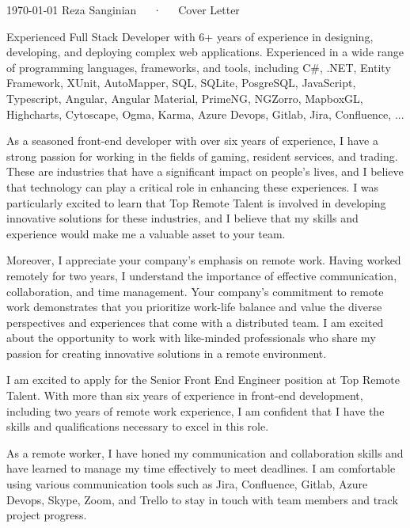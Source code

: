 \documentclass[11pt, a4paper]{awesome-cv}
\begin{document}
\makecvheader[R]

\makecvfooter
  {\today}
  {Reza Sanginian~~~·~~~Cover Letter}
  {}

\makelettertitle

\begin{cvletter}

Experienced Full Stack Developer with 6+ years of experience in designing, developing, and deploying complex web applications. Experienced in a
wide range of programming languages, frameworks, and tools, including C\#, .NET, Entity Framework, XUnit, AutoMapper, SQL, SQLite, PosgreSQL,
JavaScript, Typescript, Angular, Angular Material, PrimeNG, NGZorro, MapboxGL, Highcharts, Cytoscape, Ogma, Karma, Azure Devops, Gitlab, Jira,
Confluence, ...

As a seasoned front-end developer with over six years of experience, I have a strong passion for working in the fields of gaming, resident services, and trading. These are industries that have a significant impact on people's lives, and I believe that technology can play a critical role in enhancing these experiences. I was particularly excited to learn that Top Remote Talent is involved in developing innovative solutions for these industries, and I believe that my skills and experience would make me a valuable asset to your team.

Moreover, I appreciate your company's emphasis on remote work. Having worked remotely for two years, I understand the importance of effective communication, collaboration, and time management. Your company's commitment to remote work demonstrates that you prioritize work-life balance and value the diverse perspectives and experiences that come with a distributed team. I am excited about the opportunity to work with like-minded professionals who share my passion for creating innovative solutions in a remote environment.

I am excited to apply for the Senior Front End Engineer position at Top Remote Talent. With more than six years of experience in front-end development, including two years of remote work experience, I am confident that I have the skills and qualifications necessary to excel in this role.

As a remote worker, I have honed my communication and collaboration skills and have learned to manage my time effectively to meet deadlines. I am comfortable using various communication tools such as Jira, Confluence, Gitlab, Azure Devops, Skype, Zoom, and Trello to stay in touch with team members and track project progress.

\end{cvletter}


\makeletterclosing
\end{document}
